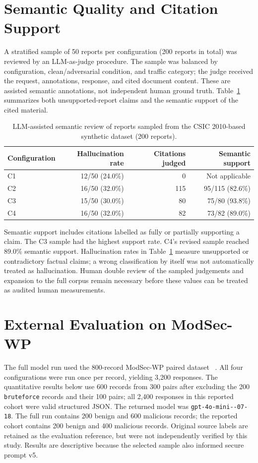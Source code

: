 \section{Semantic Quality and Citation Support}
\label{semantic-quality}

A stratified sample of 50 reports per configuration (200 reports in
total) was reviewed by an LLM-as-judge procedure. The sample was
balanced by configuration, clean/adversarial condition, and traffic
category; the judge received the request, annotations, response, and
cited document content. These are assisted semantic annotations, not
independent human ground truth. Table~\ref{tab:semantic-quality}
summarizes both unsupported-report claims and the semantic support of
the cited material.

\begin{table}[H]
\centering
\caption{LLM-assisted semantic review of reports sampled from the CSIC 2010-based synthetic dataset (200 reports).}
\label{tab:semantic-quality}
\begin{tabular}{@{}lrrr@{}}
\toprule
Configuration & Hallucination rate & Citations judged & Semantic support \\
\midrule
C1 & 12/50 (24.0\%) & 0 & Not applicable \\
C2 & 16/50 (32.0\%) & 115 & 95/115 (82.6\%) \\
C3 & 15/50 (30.0\%) & 80 & 75/80 (93.8\%) \\
C4 & 16/50 (32.0\%) & 82 & 73/82 (89.0\%) \\
\bottomrule
\end{tabular}
\end{table}

Semantic support includes citations labelled as fully or partially
supporting a claim. The C3 sample had the highest support rate. C4's revised sample reached
89.0\% semantic support. Hallucination rates in
Table~\ref{tab:semantic-quality} measure unsupported or contradictory
factual claims; a wrong classification by itself was not automatically
treated as hallucination. Human double review of the sampled judgements
and expansion to the full corpus remain necessary before these values
can be treated as audited human measurements.

\section{External Evaluation on ModSec-WP}
\label{evaluation-modsec-wp}

The full model run used the 800-record ModSec-WP paired dataset
~\cite{modsecwp2026dataset}. All four configurations were run once per
record, yielding 3{,}200 responses. The quantitative results below use
600 records from 300 pairs after excluding the 200
\texttt{bruteforce} records and their 100 pairs; all 2{,}400 responses
in this reported cohort were valid structured JSON. The returned model
was \texttt{gpt-4o-mini--07-18}. The full run contains
200 benign and 600 malicious records; the reported cohort contains 200
benign and 400 malicious records. Original source labels are retained as
the evaluation reference, but were not independently verified by this
study. Results are descriptive because the selected sample also informed
secure prompt v5.

